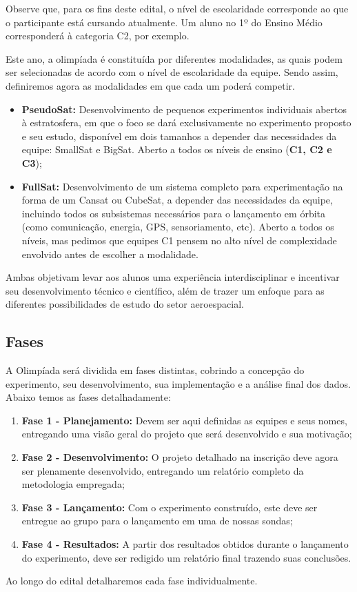         Observe que, para os fins deste edital, o nível de escolaridade corresponde ao que o participante está cursando atualmente. Um aluno no 1º do Ensino Médio corresponderá à categoria C2, por exemplo.
    
        Este ano, a olimpíada é constituída por diferentes modalidades, as quais podem ser selecionadas de acordo com o nível de escolaridade da equipe. Sendo assim, definiremos agora as modalidades em que cada um poderá competir.
        
        \begin{itemize}
            \item \textbf{PseudoSat:} Desenvolvimento de pequenos experimentos individuais abertos à estratosfera, em que o foco se dará exclusivamente no experimento proposto e seu estudo, disponível em dois tamanhos a depender das necessidades da equipe: SmallSat e BigSat. Aberto a todos os níveis de ensino (\textbf{C1, C2 e C3});
            
            \item \textbf{FullSat:} Desenvolvimento de um sistema completo para experimentação na forma de um Cansat ou CubeSat, a depender das necessidades da equipe, incluindo todos os subsistemas necessários para o lançamento em órbita (como comunicação, energia, GPS, sensoriamento, etc). Aberto a todos os níveis, mas pedimos que equipes C1 pensem no alto nível de complexidade envolvido antes de escolher a modalidade.
        \end{itemize}

        Ambas objetivam levar aos alunos uma experiência interdisciplinar e incentivar seu desenvolvimento técnico e científico, além de trazer um enfoque para as diferentes possibilidades de estudo do setor aeroespacial.

    \subsection{Fases}
        A Olimpíada será dividida em fases distintas, cobrindo a concepção do experimento, seu desenvolvimento, sua implementação e a análise final dos dados. Abaixo temos as fases detalhadamente:
        \begin{enumerate}
            \item \textbf{Fase 1 - Planejamento:} Devem ser aqui definidas as equipes e seus nomes, entregando uma visão geral do projeto que será desenvolvido e sua motivação;
            \item \textbf{Fase 2 - Desenvolvimento:} O projeto detalhado na inscrição deve agora ser plenamente desenvolvido, entregando um relatório completo da metodologia empregada;
            \item \textbf{Fase 3 - Lançamento:} Com o experimento construído, este deve ser entregue ao grupo para o lançamento em uma de nossas sondas;
            \item \textbf{Fase 4 - Resultados:} A partir dos resultados obtidos durante o lançamento do experimento, deve ser redigido um relatório final trazendo suas conclusões.
        \end{enumerate}
        Ao longo do edital detalharemos cada fase individualmente.


